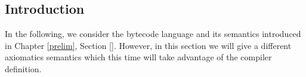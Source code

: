 \subsection{Introduction}\label{pog:bc}
In the following, we consider the bytecode language and its semantics introduced in Chapter \ref{prelim}, Section \ref{}. 
However, in this section we will give a different axiomatics semantics which this time will take advantage of the compiler definition.
 

